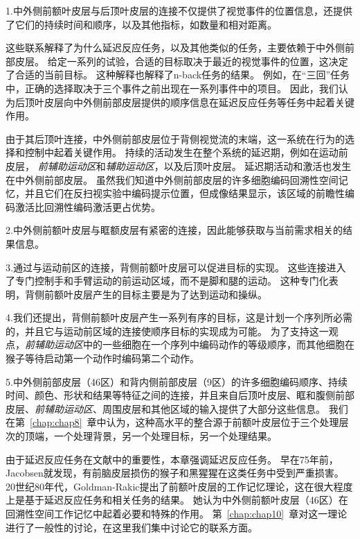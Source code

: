 1.中外侧前额叶皮层与后顶叶皮层的连接不仅提供了视觉事件的位置信息，还提供了它们的持续时间和顺序，以及其他指标，如数量和相对距离。


这些联系解释了为什么延迟反应任务，以及其他类似的任务，主要依赖于中外侧前部皮层。
给定一系列的试验，合适的目标取决于最近的视觉事件的位置，这决定了合适的当前目标。
这种解释也解释了n-back任务的结果。
例如，在“三回”任务中，正确的选择取决于三个事件之前出现在一系列事件中的项目。
因此，我们认为后顶叶皮层向中外侧前部皮层提供的顺序信息在延迟反应任务等任务中起着关键作用。


由于其后顶叶连接，中外侧前部皮层位于背侧视觉流的末端，这一系统在行为的选择和控制中起着关键作用。
持续的活动发生在整个系统的延迟期，例如在运动前皮层\cite{wise1985primate}， \textit{前辅助运动区}和\textit{辅助运动区}\cite{shima2000neuronal}，以及后顶叶皮层\cite{kalaska1995deciding}。
延迟期活动和激活也发生在中外侧前部皮层。
虽然我们知道中外侧前部皮层的许多细胞编码回溯性空间记忆\cite{genovesio2006neuronal}，并且它们在反扫视实验中编码提示位置\cite{funahashi1993prefrontal}，但成像结果显示，该区域的前瞻性编码激活比回溯性编码激活更占优势。
\par


2.中外侧前额叶皮层与眶额皮层有紧密的连接\cite{barbas1989architecture}，因此能够获取与当前需求相关的结果信息。
\par


3.通过与运动前区的连接，背侧前额叶皮层可以促进目标的实现。
这些连接进入了专门控制手和手臂运动的前运动区域，而不是脚和腿的运动。
这种专门化表明，背侧前额叶皮层产生的目标主要是为了达到运动和操纵。
\par


4.我们还提出，背侧前额叶皮层产生一系列有序的目标，这是计划一个序列所必需的，并且它与运动前区域的连接使顺序目标的实现成为可能。
为了支持这一观点，\textit{前辅助运动区}中的一些细胞在一个序列中编码动作的等级顺序\cite{shima2000neuronal}，而其他细胞在猴子等待启动第一个动作时编码第二个动作\cite{nakajima2009covert}。
\par


5.中外侧前部皮层（46区）和背内侧前部皮层（9区）的许多细胞编码顺序、持续时间、颜色、形状和结果等特征之间的连接，并且来自后顶叶皮层、眶和腹侧前部皮层、\textit{前辅助运动区}、周围皮层和其他区域的输入提供了大部分这些信息。
我们在第~\ref{chap:chap8}~章中认为，这种高水平的整合源于前额叶皮层位于三个处理层次的顶端，一个处理背景，另一个处理目标，另一个处理结果。


由于延迟反应任务在文献中的重要性，本章强调延迟反应任务。
早在75年前，Jacobsen就发现，有前脑皮层损伤的猴子和黑猩猩\cite{jacobsen1935functions}在这类任务中受到严重损害。
20世纪80年代，Goldman-Rakic\cite{ps1987circuitry}提出了前额叶皮层的工作记忆理论，这在很大程度上是基于延迟反应任务和相关任务的结果。
她认为中外侧前额叶皮层（46区）在回溯性空间工作记忆中起着必要和特殊的作用\cite{goldman1996prefrontal}。
第~\ref{chap:chap10}~章对这一理论进行了一般性的讨论，在这里我们集中讨论它的联系方面。



